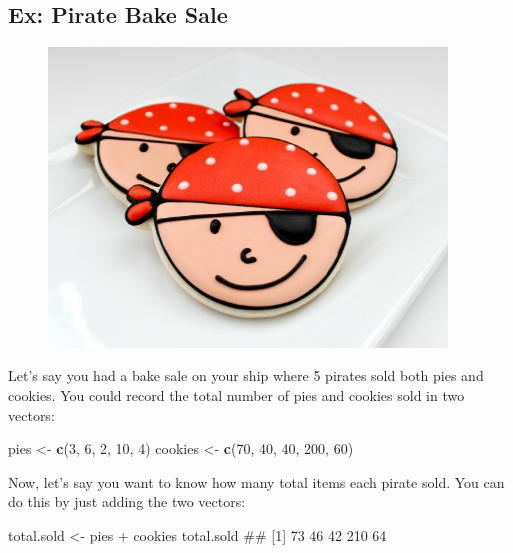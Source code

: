 \documentclass[]{book}
\newenvironment{Shaded}{\begin{snugshade}}{\end{snugshade}}
\newcommand{\KeywordTok}[1]{\textcolor[rgb]{0.13,0.29,0.53}{\textbf{{#1}}}}
\newcommand{\DecValTok}[1]{\textcolor[rgb]{0.00,0.00,0.81}{{#1}}}
\newcommand{\StringTok}[1]{\textcolor[rgb]{0.31,0.60,0.02}{{#1}}}
\newcommand{\NormalTok}[1]{{#1}}
\theoremstyle{definition}
\theoremstyle{definition}
\theoremstyle{remark}
\begin{document}
\subsection{Ex: Pirate Bake Sale}\label{ex-pirate-bake-sale}

\begin{figure}

{\centering \includegraphics[width=400px]{images/piratecookies} 

}

\end{figure}

Let's say you had a bake sale on your ship where 5 pirates sold both
pies and cookies. You could record the total number of pies and cookies
sold in two vectors:

\begin{Shaded}
\begin{Highlighting}[]
\NormalTok{pies <-}\StringTok{ }\KeywordTok{c}\NormalTok{(}\DecValTok{3}\NormalTok{, }\DecValTok{6}\NormalTok{, }\DecValTok{2}\NormalTok{, }\DecValTok{10}\NormalTok{, }\DecValTok{4}\NormalTok{)}
\NormalTok{cookies <-}\StringTok{ }\KeywordTok{c}\NormalTok{(}\DecValTok{70}\NormalTok{, }\DecValTok{40}\NormalTok{, }\DecValTok{40}\NormalTok{, }\DecValTok{200}\NormalTok{, }\DecValTok{60}\NormalTok{)}
\end{Highlighting}
\end{Shaded}

Now, let's say you want to know how many total items each pirate sold.
You can do this by just adding the two vectors:

\begin{Shaded}
\begin{Highlighting}[]
\NormalTok{total.sold <-}\StringTok{ }\NormalTok{pies +}\StringTok{ }\NormalTok{cookies}
\NormalTok{total.sold}
\NormalTok{## [1]  73  46  42 210  64}
\end{Highlighting}
\end{Shaded}
\end{document}
